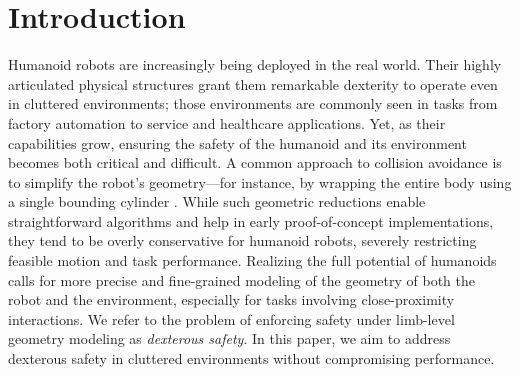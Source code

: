 
\section{Introduction}\label{sec:intro}



Humanoid robots are increasingly being deployed in the real world.
Their highly articulated physical structures grant them remarkable dexterity to operate even in cluttered environments; those environments are commonly seen in tasks from factory automation to service and healthcare applications.
Yet, as their capabilities grow, ensuring the safety of the humanoid and its environment becomes both critical and difficult.
A common approach to collision avoidance is to simplify the robot’s geometry—for instance, by wrapping the entire body using a single bounding cylinder \cite{yun2024safe, he2024agile}.
While such geometric reductions enable straightforward algorithms and help in early proof-of-concept implementations, they tend to be overly conservative for humanoid robots, severely restricting feasible motion and task performance.
Realizing the full potential of humanoids calls for more precise and fine-grained modeling of the geometry of both the robot and the environment, especially for tasks involving close-proximity interactions.
We refer to the problem of enforcing safety under limb-level geometry modeling as \textit{dexterous safety}.
In this paper, we aim to address dexterous safety in cluttered environments without compromising performance.

